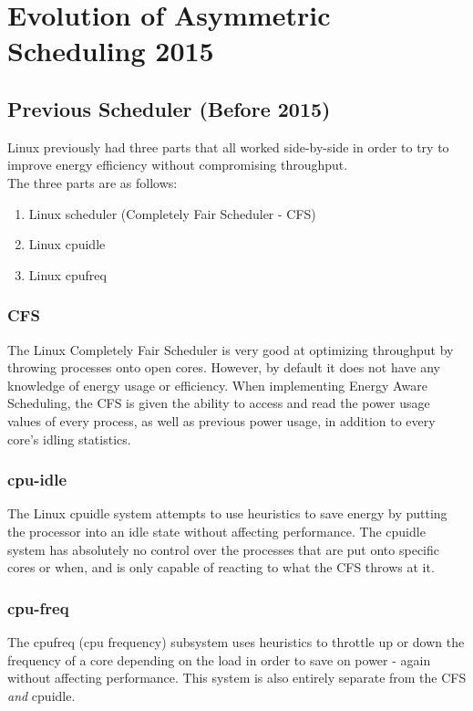 \section{Evolution of Asymmetric Scheduling 2015}
\subsection{Previous Scheduler (Before 2015)}
Linux previously had three parts that all worked side-by-side in order to try to improve energy efficiency without compromising throughput.\\
The three parts are as follows:
\begin{enumerate} 
    \item Linux scheduler (Completely Fair Scheduler - CFS)
    \item Linux cpuidle
    \item Linux cpufreq
\end{enumerate}

\subsubsection{CFS}
The Linux Completely Fair Scheduler is very good at optimizing throughput by throwing processes onto open cores. However, by default it does not have any knowledge of energy usage or efficiency. When implementing Energy Aware Scheduling, the CFS is given the ability to access and read the power usage values of every process, as well as previous power usage, in addition to every core's idling statistics.\cite{EAS2015}

\subsubsection{cpu-idle}
The Linux cpuidle system attempts to use heuristics to save energy by putting the processor into an idle state without affecting performance. The cpuidle system has absolutely no control over the processes that are put onto specific cores or when, and is only capable of reacting to what the CFS throws at it.\cite{EAS2015}

\subsubsection{cpu-freq}
The cpufreq (cpu frequency) subsystem uses heuristics to throttle up or down the frequency of a core depending on the load in order to save on power - again without affecting performance. This system is also entirely separate from the CFS \textit{and} cpuidle. \cite{EAS2015}

